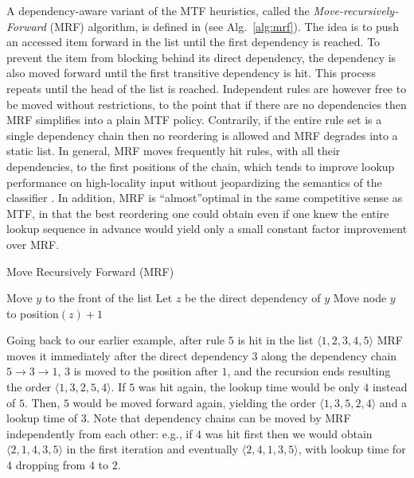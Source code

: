 

A dependency-aware variant of the MTF heuristics, called the \emph{Move-recursively-Forward} (MRF) algorithm, is defined in \cite{10228937} (see Alg.~\ref{alg:mrf}). The idea is to push an accessed item forward in the list until the first dependency is reached. To prevent the item from blocking behind its direct dependency, the dependency is also moved forward until the first transitive dependency is hit. This process repeats until the head of the list is reached.  Independent rules are however free to be moved without restrictions, to the point that if there are no dependencies then MRF simplifies into a plain MTF policy.  Contrarily, if the entire rule set is a single dependency chain then no reordering is allowed and MRF degrades into a static list. In general, MRF moves frequently hit rules, with all their dependencies, to the first positions of the chain, which tends to improve lookup performance on high-locality input without jeopardizing the semantics of the classifier \cite{10228937}. In addition, MRF is ``almost''optimal in the same competitive sense as MTF, in that the best reordering one could obtain even if one knew the entire lookup sequence in advance would yield only a small constant factor improvement over MRF.

\begin{algorithm}[t]
  \caption{Move Recursively Forward (MRF)}
  \label{alg:mrf}
  \begin{small}
    \begin{algorithmic}[1]
      \State Move $y$ to the front of the list
      \Else
      \State Let $z$ be the direct dependency of $y$
      \State Move node $y$ to position$(z) + 1$
      \State {}
      \EndIf
      \EndProcedure
    \end{algorithmic}
  \end{small}
\end{algorithm}

Going back to our earlier example, after rule $5$ is hit in the list $\langle1, 2, 3, 4, 5\rangle$ MRF moves it immediately after the direct dependency $3$ along the dependency chain $5\to 3\to 1$, $3$ is moved to the position after $1$, and the recursion ends resulting the order $\langle1, 3, 2, 5, 4\rangle$. If $5$ was hit again, the lookup time would be only $4$ instead of $5$. Then, $5$ would be moved forward again, yielding the order $\langle1, 3, 5, 2, 4\rangle$ and a lookup time of $3$. Note that dependency chains can be moved by MRF independently from each other: e.g., if $4$ was hit first then we would obtain $\langle2, 1, 4, 3, 5\rangle$ in the first iteration and eventually $\langle2, 4, 1, 3, 5\rangle$, with lookup time for $4$ dropping from $4$ to $2$.

